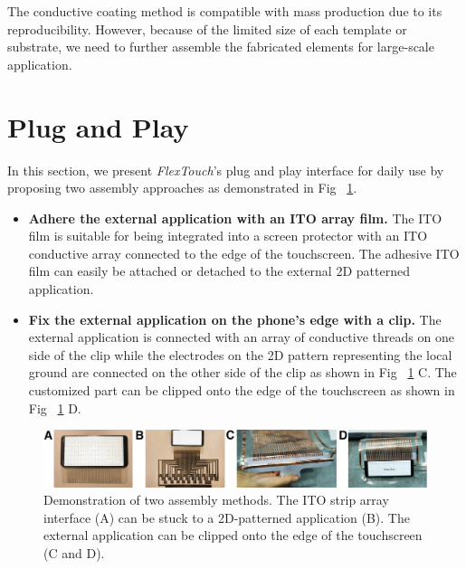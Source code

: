 The conductive coating method is compatible with mass production due to its reproducibility. However, because of the limited size of each template or substrate, we need to further assemble the fabricated elements for large-scale application.

\section{Plug and Play}
In this section, we present \textit{FlexTouch}'s plug and play interface for daily use by proposing two assembly approaches as demonstrated in Fig ~\ref{fig:plugandplay}. 

\begin{itemize}
    \item \textbf{Adhere the external application with an ITO array film.} The ITO film is suitable for being integrated into a screen protector with an ITO conductive array connected to the edge of the touchscreen. The adhesive ITO film can easily be attached or detached to the external 2D patterned application. 
    \item \textbf{Fix the external application on the phone's edge with a clip.} The external application is connected with an array of conductive threads on one side of the clip while the electrodes on the 2D pattern representing the local ground are connected on the other side of the clip as shown in Fig ~\ref{fig:plugandplay} C. The customized part can be clipped onto the edge of the touchscreen as shown in Fig ~\ref{fig:plugandplay} D. 
\end{itemize}

\begin{figure}[ht]
    \centering
      \includegraphics[width=0.8\columnwidth]{figures/plugandplay.png}
      \setlength{\belowcaptionskip}{-8pt}
      \caption{Demonstration of two assembly methods. The ITO strip array interface (A) can be stuck to a 2D-patterned application (B). The external application can be clipped onto the edge of the touchscreen (C and D).}
      \label{fig:plugandplay}
\end{figure}

